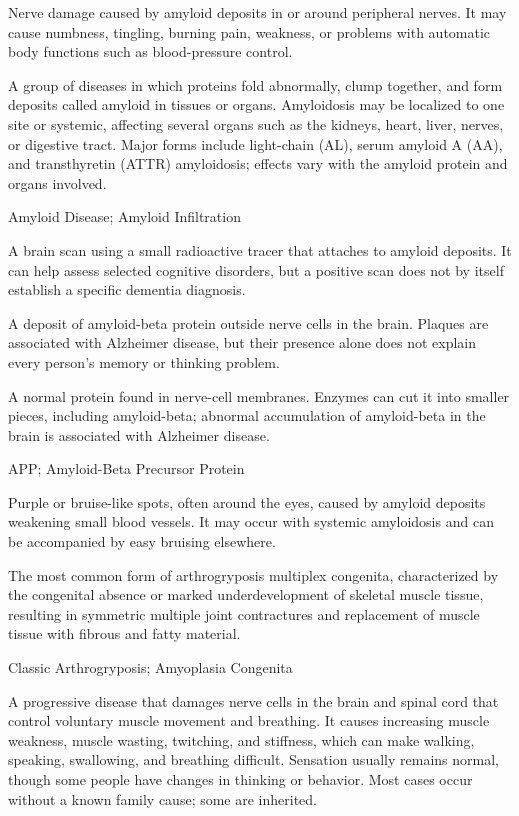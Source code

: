 Nerve damage caused by amyloid deposits in or around peripheral nerves. It may cause numbness, tingling, burning pain, weakness, or problems with automatic body functions such as blood-pressure control.

 A group of diseases in which proteins fold abnormally, clump together, and form deposits called amyloid in tissues or organs. Amyloidosis may be localized to one site or systemic, affecting several organs such as the kidneys, heart, liver, nerves, or digestive tract. Major forms include light-chain (AL), serum amyloid A (AA), and transthyretin (ATTR) amyloidosis; effects vary with the amyloid protein and organs involved.

\synonyms
Amyloid Disease; Amyloid Infiltration

 A brain scan using a small radioactive tracer that attaches to amyloid deposits. It can help assess selected cognitive disorders, but a positive scan does not by itself establish a specific dementia diagnosis.

 A deposit of amyloid-beta protein outside nerve cells in the brain. Plaques are associated with Alzheimer disease, but their presence alone does not explain every person’s memory or thinking problem.

 A normal protein found in nerve-cell membranes. Enzymes can cut it into smaller pieces, including amyloid-beta; abnormal accumulation of amyloid-beta in the brain is associated with Alzheimer disease.

\synonyms
APP; Amyloid-Beta Precursor Protein

 Purple or bruise-like spots, often around the eyes, caused by amyloid deposits weakening small blood vessels. It may occur with systemic amyloidosis and can be accompanied by easy bruising elsewhere.

 The most common form of arthrogryposis multiplex congenita, characterized by the congenital absence or marked underdevelopment of skeletal muscle tissue, resulting in symmetric multiple joint contractures and replacement of muscle tissue with fibrous and fatty material.

\synonyms
Classic Arthrogryposis; Amyoplasia Congenita

 A progressive disease that damages nerve cells in the brain and spinal cord that control voluntary muscle movement and breathing. It causes increasing muscle weakness, muscle wasting, twitching, and stiffness, which can make walking, speaking, swallowing, and breathing difficult. Sensation usually remains normal, though some people have changes in thinking or behavior. Most cases occur without a known family cause; some are inherited.

